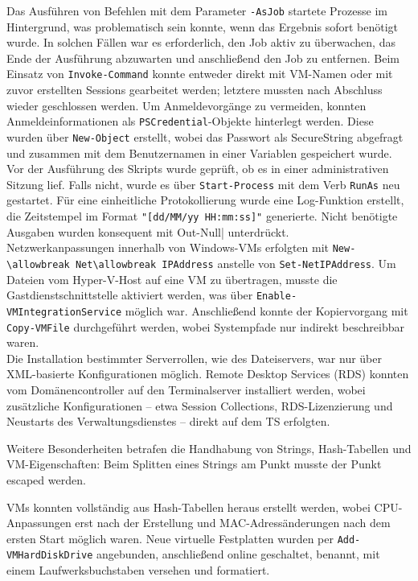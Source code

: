 \documentclass[a4paper,12pt]{article}
\begin{document}
Das Ausführen von Befehlen mit dem Parameter \lstinline|-AsJob| startete Prozesse im Hintergrund, was problematisch sein konnte, wenn das Ergebnis sofort benötigt wurde. In solchen Fällen war es erforderlich, den Job aktiv zu überwachen, das Ende der Ausführung abzuwarten und anschlie\ss end den Job zu entfernen. Beim Einsatz von \lstinline|Invoke-Command| konnte entweder direkt mit VM-Namen oder mit zuvor erstellten Sessions gearbeitet werden; letztere mussten nach Abschluss wieder geschlossen werden. Um Anmeldevorgänge zu vermeiden, konnten Anmeldeinformationen als \lstinline|PSCredential|-Objekte hinterlegt werden. Diese wurden über \lstinline|New-Object| erstellt, wobei das Passwort als SecureString abgefragt und zusammen mit dem Benutzernamen in einer Variablen gespeichert wurde. \\ 

Vor der Ausführung des Skripts wurde geprüft, ob es in einer administrativen Sitzung lief. Falls nicht, wurde es über \lstinline|Start-Process| mit dem Verb \lstinline|RunAs| neu gestartet. Für eine einheitliche Protokollierung wurde eine Log-Funktion erstellt, die Zeitstempel im Format \lstinline|"[dd/MM/yy HH:mm:ss]"| generierte. Nicht benötigte Ausgaben wurden konsequent mit \lstinline|| Out-Null| unterdrückt. \\ 

Netzwerkanpassungen innerhalb von Windows-VMs erfolgten mit \lstinline|New-\allowbreak Net\allowbreak IPAddress| anstelle von \lstinline|Set-NetIPAddress|. Um Dateien vom Hyper-V-Host auf eine VM zu übertragen, musste die Gastdienstschnittstelle aktiviert werden, was über \lstinline|Enable-VMIntegrationService| möglich war. Anschlie\ss end konnte der Kopiervorgang mit \lstinline|Copy-VMFile| durchgeführt werden, wobei Systempfade nur indirekt beschreibbar waren.\\  

Die Installation bestimmter Serverrollen, wie des Dateiservers, war nur über XML-basierte Konfigurationen möglich. Remote Desktop Services (RDS) konnten vom Domänencontroller auf den Terminalserver installiert werden, wobei zusätzliche Konfigurationen -- etwa Session Collections, RDS-Lizenzierung und Neustarts des Verwaltungsdienstes -- direkt auf dem TS erfolgten.  

Weitere Besonderheiten betrafen die Handhabung von Strings, Hash-Tabellen und VM-Eigenschaften: Beim Splitten eines Strings am Punkt musste der Punkt escaped werden. 

VMs konnten vollständig aus Hash-Tabellen heraus erstellt werden, wobei CPU-Anpassungen erst nach der Erstellung und MAC-Adressänderungen nach dem ersten Start möglich waren. Neue virtuelle Festplatten wurden per \lstinline|Add-VMHardDiskDrive| angebunden, anschlie\ss end online geschaltet, benannt, mit einem Laufwerksbuchstaben versehen und formatiert. \\
\end{document}
